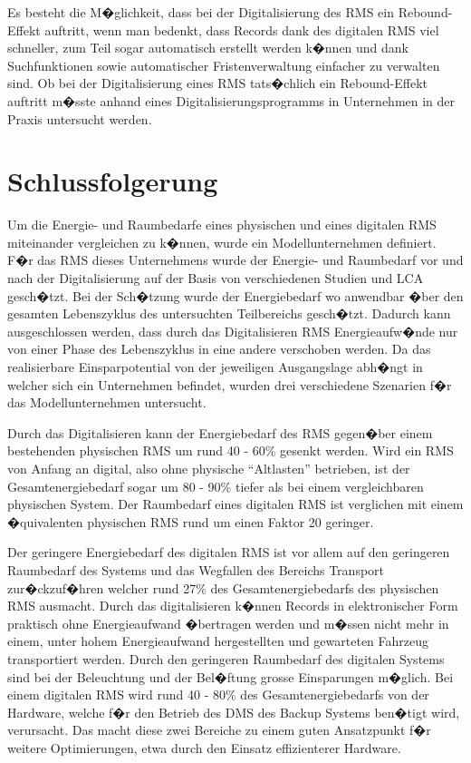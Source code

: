 \documentclass[a4paper,twoside,10pt]{report}
\begin{document}
Es besteht die M�glichkeit, dass bei der Digitalisierung des \ac{RMS} ein Rebound-Effekt auftritt, wenn man bedenkt, dass Records dank des digitalen \ac{RMS} viel schneller, zum Teil sogar automatisch erstellt werden k�nnen und dank Suchfunktionen sowie automatischer Fristenverwaltung einfacher zu verwalten sind. Ob bei der Digitalisierung eines \ac{RMS} tats�chlich ein Rebound-Effekt auftritt m�sste anhand eines Digitalisierungsprogramms in Unternehmen in der Praxis untersucht werden.\cite{rebound}


\cleardoublepage
\acresetall
\chapter{Schlussfolgerung}\label{schlussfolgerung}

Um die Energie- und Raumbedarfe eines physischen und eines digitalen \ac{RMS} miteinander vergleichen zu k�nnen, wurde ein Modellunternehmen definiert. F�r das \ac{RMS} dieses Unternehmens wurde der Energie- und Raumbedarf vor und nach der Digitalisierung auf der Basis von verschiedenen Studien und \ac{LCA} gesch�tzt. Bei der Sch�tzung wurde der Energiebedarf wo anwendbar �ber den gesamten Lebenszyklus des untersuchten Teilbereichs gesch�tzt. Dadurch kann ausgeschlossen werden, dass durch das Digitalisieren \ac{RMS} Energieaufw�nde nur von einer Phase des Lebenszyklus in eine andere verschoben werden. Da das realisierbare Einsparpotential von der jeweiligen Ausgangslage abh�ngt in welcher sich ein Unternehmen befindet, wurden drei verschiedene Szenarien f�r das Modellunternehmen untersucht.

Durch das Digitalisieren kann der Energiebedarf des \ac{RMS} gegen�ber einem bestehenden physischen \ac{RMS} um rund 40 - 60\% gesenkt werden. Wird ein \ac{RMS} von Anfang an digital, also ohne physische "`Altlasten"' betrieben, ist der Gesamtenergiebedarf sogar um 80 - 90\% tiefer als bei einem vergleichbaren physischen System. Der Raumbedarf eines digitalen \ac{RMS} ist verglichen mit einem �quivalenten physischen \ac{RMS} rund um einen Faktor 20 geringer. 

Der geringere Energiebedarf des digitalen \ac{RMS} ist vor allem auf den geringeren Raumbedarf des Systems und das Wegfallen des Bereichs Transport zur�ckzuf�hren welcher rund 27\% des Gesamtenergiebedarfs des physischen \ac{RMS} ausmacht. Durch das digitalisieren k�nnen Records in elektronischer Form praktisch ohne Energieaufwand �bertragen werden und m�ssen nicht mehr in einem, unter hohem Energieaufwand hergestellten und gewarteten Fahrzeug transportiert werden. Durch den geringeren Raumbedarf des digitalen Systems sind bei der Beleuchtung und der Bel�ftung grosse Einsparungen m�glich. Bei einem digitalen \ac{RMS} wird rund 40 - 80\% des Gesamtenergiebedarfs von der Hardware, welche f�r den Betrieb des DMS des Backup Systems ben�tigt wird, verursacht. Das macht diese zwei Bereiche zu einem guten Ansatzpunkt f�r weitere Optimierungen, etwa durch den Einsatz effizienterer Hardware.
\end{document}
